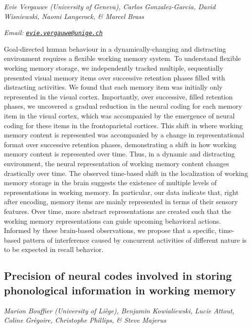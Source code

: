 \documentclass[12pt,]{book}
\begin{document}
\emph{Evie Vergauwe (University of Geneva), Carlos Gonzalez-Garcia, David Wisniewski, Naomi Langerock, \& Marcel Brass}

\emph{Email: \href{mailto:evie.vergauwe@unige.ch}{\nolinkurl{evie.vergauwe@unige.ch}}}

Goal-directed human behaviour in a dynamically-changing and distracting environment requires a flexible working memory system. To understand flexible working memory storage, we independently tracked multiple, sequentially presented visual memory items over successive retention phases filled with distracting activities. We found that each memory item was initially only represented in the visual cortex. Importantly, over successive, filled retention phases, we uncovered a gradual reduction in the neural coding for each memory item in the visual cortex, which was accompanied by the emergence of neural coding for these items in the frontoparietal cortices. This shift in where working memory content is represented was accompanied by a change in representational format over successive retention phases, demonstrating a shift in how working memory content is represented over time. Thus, in a dynamic and distracting environment, the neural representation of working memory content changes drastically over time. The observed time-based shift in the localization of working memory storage in the brain suggests the existence of multiple levels of representations in working memory. In particular, our data indicate that, right after encoding, memory items are mainly represented in terms of their sensory features. Over time, more abstract representations are created such that the working memory representations can guide upcoming behavioral actions. Informed by these brain-based observations, we propose that a specific, time-based pattern of interference caused by concurrent activities of different nature is to be expected in recall behavior.

\hypertarget{precision-of-neural-codes-involved-in-storing-phonological-information-in-working-memory}{%
\subsection{Precision of neural codes involved in storing phonological information in working memory}\label{precision-of-neural-codes-involved-in-storing-phonological-information-in-working-memory}}

\emph{Marion Bouffier (University of Liège), Benjamin Kowialiewski, Lucie Attout, Coline Grègoire, Christophe Phillips, \& Steve Majerus}
\end{document}

